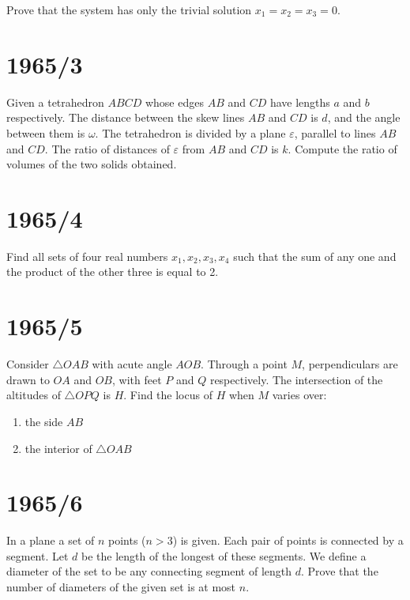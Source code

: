 \documentclass[12pt]{article}
\begin{document}
Prove that the system has only the trivial solution
$x_1 = x_2 = x_3 = 0$.

\section*{1965/3}

Given a tetrahedron $ABCD$ whose edges $AB$ and $CD$ have lengths $a$ and $b$ respectively. The distance between the skew lines $AB$ and $CD$ is $d$, and the angle between them is $\omega$. The tetrahedron is divided by a plane $\varepsilon$, parallel to lines $AB$ and $CD$. The ratio of distances of $\varepsilon$ from $AB$ and $CD$ is $k$. Compute the ratio of volumes of the two solids obtained.

\section*{1965/4}

Find all sets of four real numbers $x_1, x_2, x_3, x_4$ such that the sum of any one and the product of the other three is equal to 2.

\section*{1965/5}

Consider $\triangle OAB$ with acute angle $AOB$. Through a point $M$, perpendiculars are drawn to $OA$ and $OB$, with feet $P$ and $Q$ respectively. The intersection of the altitudes of $\triangle OPQ$ is $H$. Find the locus of $H$ when $M$ varies over:

\begin{enumerate}

\item the side $AB$

\item the interior of $\triangle OAB$

\end{enumerate}

\section*{1965/6}

In a plane a set of $n$ points ($n > 3$) is given. Each pair of points is connected by a segment. Let $d$ be the length of the longest of these segments. We define a diameter of the set to be any connecting segment of length $d$. Prove that the number of diameters of the given set is at most $n$.
\end{document}
